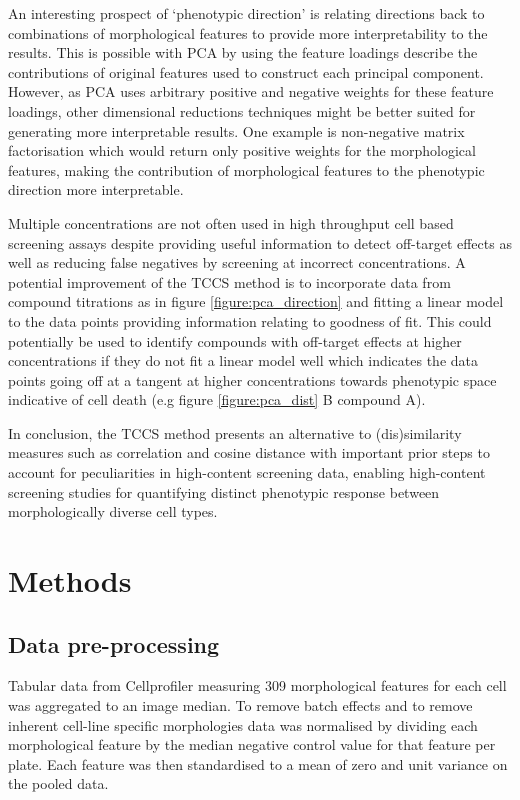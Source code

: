 \documentclass[a4paper,11pt,twoside,openright]{scrbook}
\begin{document}
An interesting prospect of `phenotypic direction' is relating directions back to combinations of morphological features to provide more interpretability to the results.
This is possible with PCA by using the feature loadings describe the contributions of original features used to construct each principal component.
However, as PCA uses arbitrary positive and negative weights for these feature loadings, other dimensional reductions techniques might be better suited for generating more interpretable results.
One example is non-negative matrix factorisation which would return only positive weights for the morphological features, making the contribution of morphological features to the phenotypic direction more interpretable.


Multiple concentrations are not often used in high throughput cell based screening assays despite providing useful information to detect off-target effects as well as reducing false negatives by screening at incorrect concentrations.
A potential improvement of the TCCS method is to incorporate data from compound titrations as in figure \ref{figure:pca_direction} and fitting a linear model to the data points providing information relating to goodness of fit.
This could potentially be used to identify compounds with off-target effects at higher concentrations if they do not fit a linear model well which indicates the data points going off at a tangent at higher concentrations towards phenotypic space indicative of cell death (e.g figure \ref{figure:pca_dist} B compound A).

In conclusion, the TCCS method presents an alternative to (dis)similarity measures such as correlation and cosine distance with important prior steps to account for peculiarities in high-content screening data, enabling high-content screening studies for quantifying distinct phenotypic response between morphologically diverse cell types.


\section{Methods}

\subsection{Data pre-processing}
Tabular data from Cellprofiler measuring 309 morphological features for each cell was aggregated to an image median.
To remove batch effects and to remove inherent cell-line specific morphologies data was normalised by dividing each morphological feature by the median negative control value for that feature per plate.
Each feature was then standardised to a mean of zero and unit variance on the pooled data.
\end{document}

